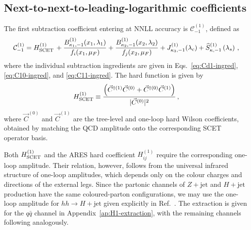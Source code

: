 \subsection{Next-to-next-to-leading-logarithmic coefficients}
\label{subsec:NNLL-coeff}

The first subtraction coefficient entering at NNLL accuracy is
$\mathcal{C}_{-1}^{(1)}$, defined as
\begin{equation}
    \mathcal{C}_{-1}^{(1)}=H^{(1)}_{\rm SCET}\,+\frac{B_{\kappa_1,-1}^{(1)}(x_1,\lambda_1)}{f_i(x_1,\mu_F)}+\frac{B_{\kappa_2,-1}^{(1)}(x_2,\lambda_2)}{f_j(x_2,\mu_F)}+J_{\kappa_3,-1}^{(1)}(\lambda_c)
    +\widehat{S}^{(1)}_{\kappa,-1}\left(\lambda_s\right)\,,
\end{equation}
where the individual subtraction ingredients are given in
Eqs.~\eqref{eq:Cd1-ingred}, \eqref{eq:C10-ingred}, and
\eqref{eq:C11-ingred}. The hard function is given by 
\begin{equation}
\label{eq:CH-SCET}
	H^{(1)}_{\rm SCET}\equiv \frac{\left(\vec{C}^{\dagger(1)}\vec{C}^{(0)}+\vec{C}^{\dagger(0)}\vec{C}^{(1)}\right)}{|\vec{C}^{(0)}|^2}\,,
\end{equation} 
where $\vec{C}^{(0)}$ and $\vec{C}^{(1)}$ are the tree-level and
one-loop hard Wilson coefficients, obtained by matching the QCD amplitude
onto the corresponding SCET operator basis.

Both $H^{(1)}_{\rm SCET}$ and the \textsc{ARES} hard coefficient
$H^{(1)}_{ij}$ require the corresponding one-loop amplitude. Their relation,
however, follows from the universal infrared structure of one-loop amplitudes,
which depends only on the colour charges and directions of the external legs.
Since the partonic channels of $Z+\mathrm{jet}$ and $H+\mathrm{jet}$ production
have the same coloured-parton configurations, we may use the one-loop amplitude
for $hh\to H+\mathrm{jet}$ given explicitly in Ref.~\cite{Ravindran:2002dc}.
The extraction is given for the $q\bar q$ channel in Appendix~\ref{ap:H1-extraction}, 
with the remaining channels following analogously.

